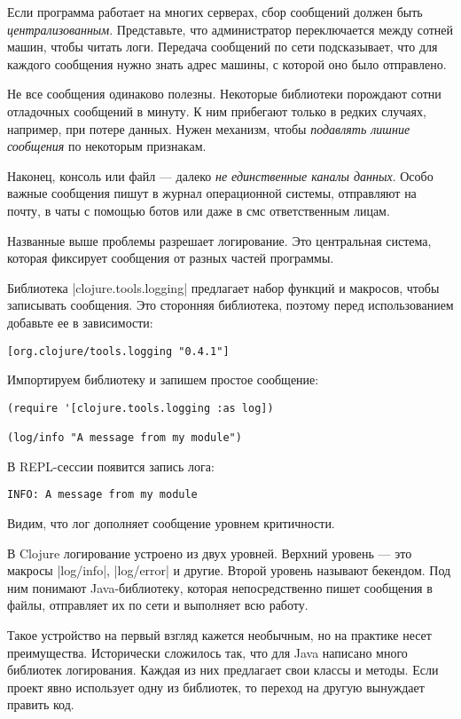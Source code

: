 Если программа работает на многих серверах, сбор сообщений должен быть
\emph{централизованным}. Представьте, что администратор переключается между сотней
машин, чтобы читать логи. Передача сообщений по сети подсказывает, что для
каждого сообщения нужно знать адрес машины, с которой оно было отправлено.

Не все сообщения одинаково полезны. Некоторые библиотеки порождают сотни
отладочных сообщений в минуту. К ним прибегают только в редких случаях,
например, при потере данных. Нужен механизм, чтобы \emph{подавлять лишние
сообщения} по некоторым признакам.

Наконец, консоль или файл — далеко \emph{не единственные каналы данных}. Особо
важные сообщения пишут в журнал операционной системы, отправляют на почту, в
чаты с помощью ботов или даже в смс ответственным лицам.

Названные выше проблемы разрешает логирование. Это центральная система, которая
фиксирует сообщения от разных частей программы.

Библиотека \spverb|clojure.tools.logging| предлагает набор функций и макросов, чтобы
записывать сообщения. Это сторонняя библиотека, поэтому перед использованием
добавьте ее в зависимости:

\begin{verbatim}
[org.clojure/tools.logging "0.4.1"]
\end{verbatim}

Импортируем библиотеку и запишем простое сообщение:

\begin{verbatim}
(require '[clojure.tools.logging :as log])

(log/info "A message from my module")
\end{verbatim}

В REPL-сессии появится запись лога:

\begin{verbatim}
INFO: A message from my module
\end{verbatim}

Видим, что лог дополняет сообщение уровнем критичности.

В Clojure логирование устроено из двух уровней. Верхний уровень — это макросы
\spverb|log/info|, \spverb|log/error| и другие. Второй уровень называют бекендом. Под ним
понимают Java-библиотеку, которая непосредственно пишет сообщения в файлы,
отправляет их по сети и выполняет всю работу.

Такое устройство на первый взгляд кажется необычным, но на практике несет
преимущества. Исторически сложилось так, что для Java написано много библиотек
логирования. Каждая из них предлагает свои классы и методы. Если проект явно
использует одну из библиотек, то переход на другую вынуждает править код.

